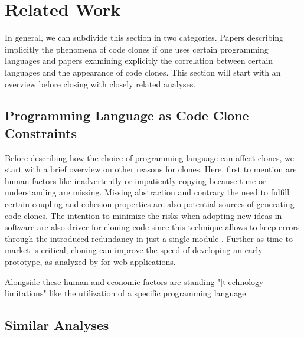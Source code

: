 
\section{Related Work}
\label{sec:related_work}

In general, we can subdivide this section in two categories. Papers describing implicitly the phenomena of code clones if one uses certain programming languages and papers examining explicitly the correlation between certain languages and the appearance of code clones. This section will start with an overview before closing with closely related analyses.

\subsection{Programming Language as Code Clone Constraints}

Before describing how the choice of programming language can affect clones, we start with a brief overview on other reasons for clones. Here, first to mention are human factors like inadvertently or impatiently copying because time or understanding are missing. Missing abstraction and contrary the need to fulfill certain coupling and cohesion properties are also potential sources of generating code clones. The intention to minimize the risks when adopting new ideas in software are also driver for cloning code since this technique allows to keep errors through the introduced redundancy in just a single module \cite{cordy2003comprehending}. Further as time-to-market is critical, cloning can improve the speed of developing an early prototype, as analyzed by \cite{rajapakse2007using} for web-applications.

Alongside these human and economic factors are standing "[t]echnology limitations" \cite{kasper2006cloning} like the utilization of a specific programming language.


\subsection{Similar Analyses}

